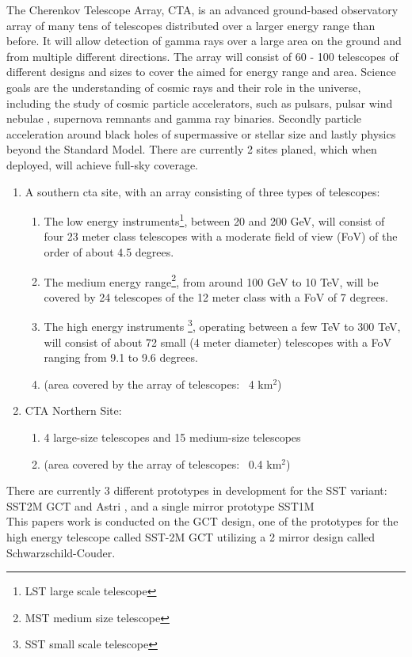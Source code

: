 \documentclass[12pt,article,type=msc,colorback,accentcolor=tud9c]{tudthesis}
\begin{document}
The Cherenkov Telescope Array, CTA, is an advanced ground-based observatory array of many tens of telescopes distributed over a larger energy range than before. It will allow detection of gamma rays over a large area on the ground and from multiple different directions. The array will consist of 60 - 100 telescopes of different designs and sizes to cover the aimed for energy range and area. Science goals are the understanding of cosmic rays and their role in the universe, including the study of cosmic particle accelerators, such as pulsars, pulsar wind nebulae , supernova remnants and gamma ray binaries. Secondly particle acceleration around black holes of supermassive or stellar size and lastly physics beyond the Standard Model. 
There are currently 2 sites planed, which when deployed, will achieve full-sky coverage.
\begin{enumerate}
\item A southern cta site, with an array consisting of three types of telescopes:\\
\begin{enumerate}
\item The low energy instruments\footnote{LST large scale telescope}, between 20 and 200 GeV, will consist of four 23 meter class telescopes with a moderate field of view (FoV) of the order of about 4.5 degrees.
\item The medium energy range\footnote{MST medium size telescope}, from around 100 GeV to 10 TeV, will be covered by 24 telescopes of the 12 meter class with a FoV of 7 degrees.
\item The high energy instruments \footnote{SST small scale telescope}, operating between a few TeV to 300 TeV, will consist of about 72 small (4 meter diameter) telescopes with a FoV ranging from 9.1 to 9.6 degrees.
\item  (area covered by the array of telescopes: ~4 km$^2$)\\
\end{enumerate}
\item CTA Northern Site:
\begin{enumerate} 
\item 4 large-size telescopes and 15 medium-size telescopes
\item (area covered by the array of telescopes: ~0.4 km$^2$)
\end{enumerate}
\end{enumerate}

There are currently 3 different prototypes in development for the SST variant: SST2M GCT and Astri , and a single mirror prototype SST1M\\
This papers work is conducted on the GCT design, one of the prototypes for the high energy telescope called SST-2M GCT utilizing a 2 mirror design called Schwarzschild-Couder.
\end{document}
